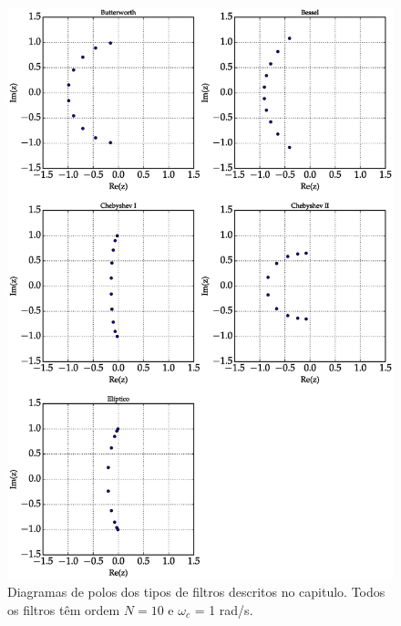 \begin{figure}[H]
\centering
\includegraphics[scale=0.625]{images/plots/filter_comparison}
\caption{Diagramas de polos dos tipos de filtros descritos no capitulo. Todos os filtros têm ordem $N = 10$ e $\omega_c$ = 1 rad/s.}
\label{fig:compare_poles}
\end{figure}


